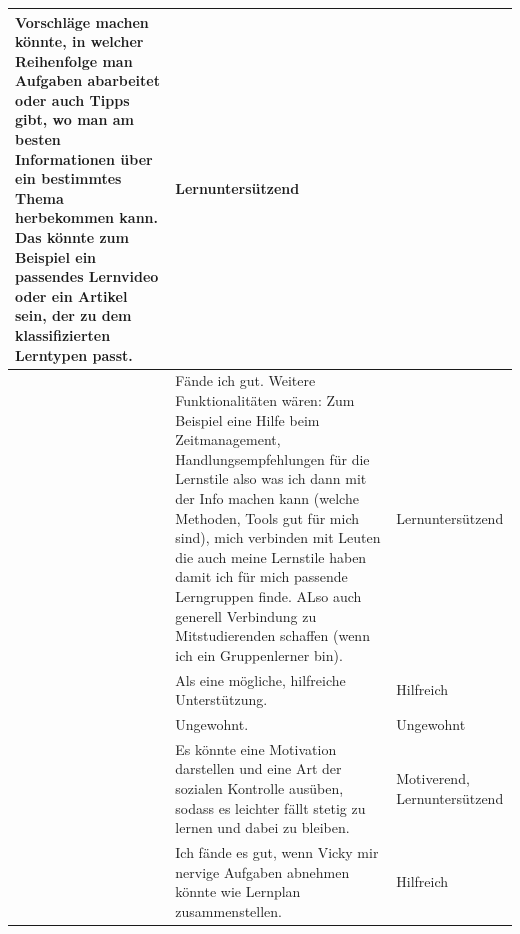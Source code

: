 \begin{longtable}{|m{2cm}|m{7cm}|m{6cm}|}
     Vorschläge machen könnte, in welcher Reihenfolge man Aufgaben abarbeitet oder auch Tipps gibt, wo man 
     am besten Informationen über ein bestimmtes Thema herbekommen kann.
     Das könnte zum Beispiel ein passendes Lernvideo oder ein Artikel sein, der zu dem klassifizierten Lerntypen passt. 									& Lernuntersützend\\ \hline
     \centering  \arraybackslash  14 &Fände ich gut. Weitere Funktionalitäten wären: Zum Beispiel eine 
    Hilfe beim Zeitmanagement, Handlungsempfehlungen für die Lernstile also was ich dann mit der Info
     machen kann (welche Methoden, Tools gut für mich sind), mich verbinden mit Leuten die auch meine 
     Lernstile haben damit ich für mich passende Lerngruppen finde. ALso auch generell Verbindung zu 
     Mitstudierenden schaffen (wenn ich ein Gruppenlerner bin).									 & Lernuntersützend\\ \hline
    \centering  \arraybackslash  15 & Als eine mögliche, hilfreiche Unterstützung.									& Hilfreich\\ \hline
    \centering  \arraybackslash  16 & Ungewohnt.									& Ungewohnt \\ \hline
    \centering  \arraybackslash 17 & Es könnte eine Motivation darstellen und eine Art der sozialen Kontrolle ausüben, sodass es leichter fällt stetig zu lernen und dabei zu bleiben.									 & Motiverend, Lernuntersützend\\ \hline
    \centering  \arraybackslash  18 & 
    Ich fände es gut, wenn Vicky mir  nervige Aufgaben abnehmen könnte wie Lernplan zusammenstellen. 									& Hilfreich\\ \hline

\end{longtable}
\endgroup


